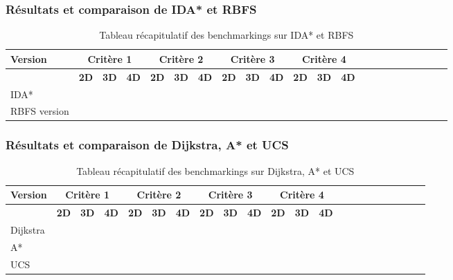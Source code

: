 \documentclass[pidr]{tnreport}
\begin{document}
		\subsubsection{Résultats et comparaison de IDA* et RBFS}
		
\begin{table}[h]
\begin{center}
   \begin{tabular}{| l | r | r | r | r | r | r | r | r | r | r | r | r | r | r | r | r | r | r | r | r | r |}
     \hline
      \textbf{Version} & \multicolumn{3}{c|}{\textbf{Critère 1}} & \multicolumn{3}{c|}{\textbf{Critère 2}} & \multicolumn{3}{c|}{\textbf{Critère 3}} & \multicolumn{3}{c|}{\textbf{Critère 4}} \\
     \hline
     \cline{2-5}
    & \textbf{2D} & \textbf{3D} & \textbf{4D} & \textbf{2D} & \textbf{3D} & \textbf{4D} & \textbf{2D} & \textbf{3D} & \textbf{4D} & \textbf{2D} & \textbf{3D} & \textbf{4D}\\ \hline
     IDA* &  &  &  &  &  &  & & &  & & &   \\ \hline
     RBFS version &  &  &  &  &  &  &  & &  &  &  &   \\ \hline
   \end{tabular}
 \end{center}
 \caption{Tableau récapitulatif des benchmarkings sur IDA* et RBFS}
\end{table}		

		\subsubsection{Résultats et comparaison de Dijkstra, A* et UCS}
		
\begin{table}[h]
\begin{center}
   \begin{tabular}{| l | r | r | r | r | r | r | r | r | r | r | r | r | r | r | r | r | r | r | r | r | r |}
     \hline
      \textbf{Version} & \multicolumn{3}{c|}{\textbf{Critère 1}} & \multicolumn{3}{c|}{\textbf{Critère 2}} & \multicolumn{3}{c|}{\textbf{Critère 3}} & \multicolumn{3}{c|}{\textbf{Critère 4}} \\
     \hline
     \cline{2-5}
    & \textbf{2D} & \textbf{3D} & \textbf{4D} & \textbf{2D} & \textbf{3D} & \textbf{4D} & \textbf{2D} & \textbf{3D} & \textbf{4D} & \textbf{2D} & \textbf{3D} & \textbf{4D}\\ \hline
     Dijkstra &  &  &  &  &  &  & & &  & & & \\ \hline
     A* &  &  &  &  &  &  &  &  &  &  &  &   \\ \hline
      UCS &  &  &  &  &  &  &  &  &  &  &  &   \\ \hline
   \end{tabular}
 \end{center}
 \caption{Tableau récapitulatif des benchmarkings sur Dijkstra, A* et UCS}
\end{table}	
		
\end{document}
